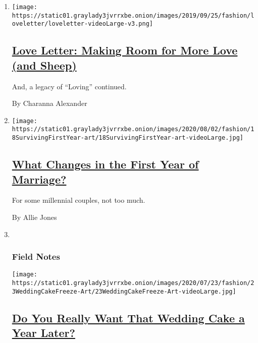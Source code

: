 \begin{enumerate}
\def\labelenumi{\arabic{enumi}.}
\item
  \texttt{[image: https://static01.graylady3jvrrxbe.onion/images/2019/09/25/fashion/loveletter/loveletter-videoLarge-v3.png]}

  \hypertarget{love-letter-making-room-for-more-love-and-sheep}{%
  \subsection{\texorpdfstring{\href{/2020/07/31/fashion/weddings/love-letter-newsletter-making-room-for-more-love-and-sheep.html}{Love
  Letter: Making Room for More Love (and
  Sheep)}}{Love Letter: Making Room for More Love (and Sheep)}}\label{love-letter-making-room-for-more-love-and-sheep}}

  And, a legacy of ``Loving'' continued.

  By Charanna Alexander
\item
  \texttt{[image: https://static01.graylady3jvrrxbe.onion/images/2020/08/02/fashion/18SurvivingFirstYear-art/18SurvivingFirstYear-art-videoLarge.jpg]}

  \hypertarget{what-changes-in-the-first-year-of-marriage}{%
  \subsection{\texorpdfstring{\href{/2020/07/23/fashion/weddings/what-changes-in-the-first-year-of-marriage.html}{What
  Changes in the First Year of
  Marriage?}}{What Changes in the First Year of Marriage?}}\label{what-changes-in-the-first-year-of-marriage}}

  For some millennial couples, not too much.

  By Allie Jones
\item ~
  \hypertarget{field-notes-1}{%
  \subsubsection{Field Notes}\label{field-notes-1}}

  \texttt{[image: https://static01.graylady3jvrrxbe.onion/images/2020/07/23/fashion/23WeddingCakeFreeze-Art/23WeddingCakeFreeze-Art-videoLarge.jpg]}

  \hypertarget{do-you-really-want-that-wedding-cake-a-year-later}{%
  \subsection{\texorpdfstring{\href{/2020/07/22/fashion/weddings/do-you-really-want-that-wedding-cake-a-year-later.html}{Do
  You Really Want That Wedding Cake a Year
  Later?}}{Do You Really Want That Wedding Cake a Year Later?}}\label{do-you-really-want-that-wedding-cake-a-year-later}}


\end{enumerate}
